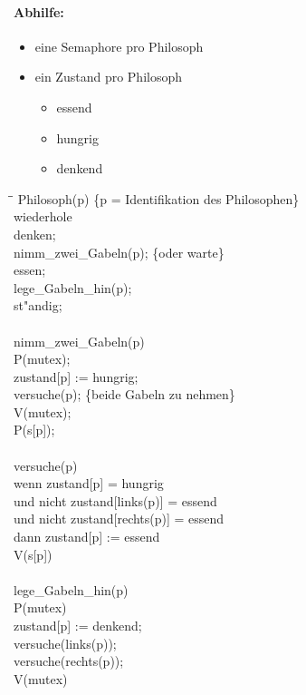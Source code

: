 \documentclass[titlepage,12pt, bibtotoc, liststotoc]{scrreprt}
\begin{document}
\paragraph{Abhilfe:}
\begin{itemize}
\item	eine Semaphore pro Philosoph
\item	ein Zustand pro Philosoph
	\begin{itemize}
	\item	essend
	\item	hungrig
	\item	denkend
	\end{itemize}
\end{itemize}

\ttfamily
\begin{tabbing}
\hspace*{5mm}\=\hspace{10mm}\=\kill
Philosoph(p) \{p = Identifikation des Philosophen\}\\
\>	wiederhole\\
\>	\>	denken;\\
\>	\>	nimm\_zwei\_Gabeln(p); \{oder warte\}\\
\>	\>	essen;\\
\>	\>	lege\_Gabeln\_hin(p);\\
\>	st"andig;\\
\\
nimm\_zwei\_Gabeln(p)\\
\>	P(mutex);\\
\>	zustand[p] := hungrig;\\
\>	versuche(p); \{beide Gabeln zu nehmen\}\\
\>	V(mutex);\\
\>	P(s[p]);\\
\\
versuche(p)\\
\>	wenn\>	zustand[p] = hungrig\\
\>	\>	und nicht zustand[links(p)] = essend\\
\>	\>	und nicht zustand[rechts(p)] = essend\\
\>	dann\>	zustand[p] := essend\\
\>	\>	V(s[p])\\
\\
lege\_Gabeln\_hin(p)\\
\>	P(mutex)\\
\>	zustand[p] := denkend;\\
\>	versuche(links(p));\\
\>	versuche(rechts(p));\\
\>	V(mutex)
\end{tabbing}
\rmfamily
\end{document}
